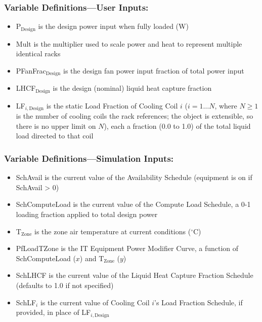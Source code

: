 \subsubsection{Variable Definitions---User Inputs:}\label{variable-definitions-user-inputs-liquidcooled}

\begin{itemize}
\tightlist
\item
  P$_\textrm{Design}$ is the design power input when fully loaded (W)
\item
  Mult is the multiplier used to scale power and heat to represent multiple identical racks
\item
  PFanFrac$_\textrm{Design}$ is the design fan power input fraction of total power input
\item
  LHCF$_\textrm{Design}$ is the design (nominal) liquid heat capture fraction
\item
  LF$_{i,\textrm{Design}}$ is the static Load Fraction of Cooling Coil $i$ ($i=1\ldots N$, where $N \geq 1$ is the number of cooling coils the rack references; the object is extensible, so there is no upper limit on $N$), each a fraction (0.0 to 1.0) of the total liquid load directed to that coil
\end{itemize}

\subsubsection{Variable Definitions---Simulation Inputs:}\label{variable-definitions-simulation-inputs-liquidcooled}

\begin{itemize}
\tightlist
\item
  SchAvail is the current value of the Availability Schedule (equipment is on if SchAvail \textgreater{} 0)
\item
  SchComputeLoad is the current value of the Compute Load Schedule, a 0-1 loading fraction applied to total design power
\item
  T$_\textrm{Zone}$ is the zone air temperature at current conditions ($^\circ$C)
\item
  PfLoadTZone is the IT Equipment Power Modifier Curve, a function of SchComputeLoad ($x$) and T$_\textrm{Zone}$ ($y$)
\item
  SchLHCF is the current value of the Liquid Heat Capture Fraction Schedule (defaults to 1.0 if not specified)
\item
  SchLF$_i$ is the current value of Cooling Coil $i$'s Load Fraction Schedule, if provided, in place of LF$_{i,\textrm{Design}}$
\end{itemize}


